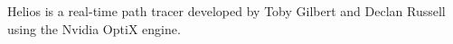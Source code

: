 Helios is a real-\/time path tracer developed by Toby Gilbert and Declan Russell using the Nvidia Opti\-X engine.





 